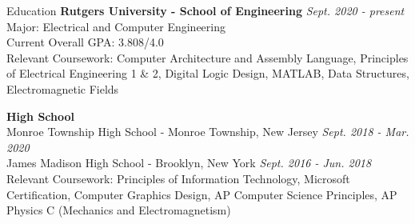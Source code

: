 \documentclass{resume}
\begin{document}


    \begin{rSection}{Education}
        {\bf Rutgers University - School of Engineering} \hfill {\em Sept. 2020 - present} \\
        Major: Electrical and Computer Engineering \\
        Current Overall GPA: 3.808/4.0 \\
        Relevant Coursework:
            Computer Architecture and Assembly Language,
            Principles of Electrical Engineering 1 \& 2,
            Digital Logic Design,
            MATLAB,
            Data Structures,
            Electromagnetic Fields

        {\bf High School}  \\
        Monroe Township High School - Monroe Township, New Jersey \hfill {\em Sept. 2018 - Mar. 2020} \\
        James Madison High School - Brooklyn, New York \hfill {\em Sept. 2016 - Jun. 2018} \\
        Relevant Coursework:
            Principles of Information Technology,
            Microsoft Certification,
            Computer Graphics Design,
            AP Computer Science Principles,
            AP Physics C (Mechanics and Electromagnetism)
    \end{rSection}

\end{document}
